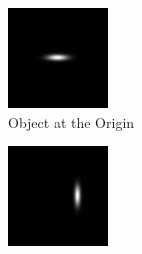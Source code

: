 \documentclass[a4paper, 11pt, titlepage]{article}
\begin{document}
        \begin{figure}
        \centering
        \begin{subfigure}{.33\textwidth}
          \centering
          \includegraphics[width=.9\linewidth]{images/GaussianSum1.png}
          \caption{Object at the Origin}
          \label{fig:vectSumsub1}
        \end{subfigure}%
        \begin{subfigure}{.33\textwidth}
          \centering
          \includegraphics[width=.9\linewidth]{images/GaussianSum2.png}

\end{subfigure}
\end{figure}
\end{document}
